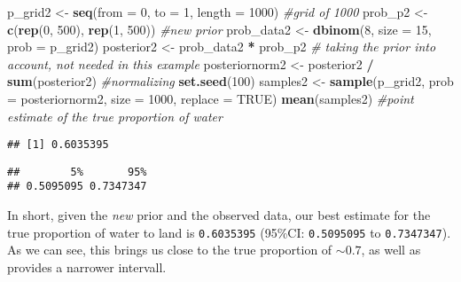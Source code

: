 \documentclass[]{article}
\newenvironment{Shaded}{\begin{snugshade}}{\end{snugshade}}
\newcommand{\CommentTok}[1]{\textcolor[rgb]{0.56,0.35,0.01}{\textit{#1}}}
\newcommand{\DataTypeTok}[1]{\textcolor[rgb]{0.13,0.29,0.53}{#1}}
\newcommand{\DecValTok}[1]{\textcolor[rgb]{0.00,0.00,0.81}{#1}}
\newcommand{\FloatTok}[1]{\textcolor[rgb]{0.00,0.00,0.81}{#1}}
\newcommand{\KeywordTok}[1]{\textcolor[rgb]{0.13,0.29,0.53}{\textbf{#1}}}
\newcommand{\NormalTok}[1]{#1}
\newcommand{\OperatorTok}[1]{\textcolor[rgb]{0.81,0.36,0.00}{\textbf{#1}}}
\newcommand{\OtherTok}[1]{\textcolor[rgb]{0.56,0.35,0.01}{#1}}
\newcommand{\StringTok}[1]{\textcolor[rgb]{0.31,0.60,0.02}{#1}}
\begin{document}
\begin{Shaded}
\begin{Highlighting}[]
\NormalTok{p_grid2 <-}\StringTok{ }\KeywordTok{seq}\NormalTok{(}\DataTypeTok{from =} \DecValTok{0}\NormalTok{, }\DataTypeTok{to =} \DecValTok{1}\NormalTok{, }\DataTypeTok{length =} \DecValTok{1000}\NormalTok{) }\CommentTok{#grid of 1000}
\NormalTok{prob_p2 <-}\StringTok{ }\KeywordTok{c}\NormalTok{(}\KeywordTok{rep}\NormalTok{(}\DecValTok{0}\NormalTok{, }\DecValTok{500}\NormalTok{), }\KeywordTok{rep}\NormalTok{(}\DecValTok{1}\NormalTok{, }\DecValTok{500}\NormalTok{)) }\CommentTok{#new prior}
\NormalTok{prob_data2 <-}\StringTok{ }\KeywordTok{dbinom}\NormalTok{(}\DecValTok{8}\NormalTok{, }\DataTypeTok{size =} \DecValTok{15}\NormalTok{, }\DataTypeTok{prob =}\NormalTok{ p_grid2)}
\NormalTok{posterior2 <-}\StringTok{ }\NormalTok{prob_data2 }\OperatorTok{*}\StringTok{ }\NormalTok{prob_p2 }\CommentTok{# taking the prior into account, not needed in this example}
\NormalTok{posteriornorm2 <-}\StringTok{ }\NormalTok{posterior2 }\OperatorTok{/}\StringTok{ }\KeywordTok{sum}\NormalTok{(posterior2) }\CommentTok{#normalizing}
\KeywordTok{set.seed}\NormalTok{(}\DecValTok{100}\NormalTok{)}
\NormalTok{samples2 <-}\StringTok{ }\KeywordTok{sample}\NormalTok{(p_grid2, }\DataTypeTok{prob =}\NormalTok{ posteriornorm2, }\DataTypeTok{size =} \DecValTok{1000}\NormalTok{, }\DataTypeTok{replace =} \OtherTok{TRUE}\NormalTok{)}
\KeywordTok{mean}\NormalTok{(samples2) }\CommentTok{#point estimate of the true proportion of water}
\end{Highlighting}
\end{Shaded}

\begin{verbatim}
## [1] 0.6035395
\end{verbatim}

\begin{Shaded}
\end{Shaded}

\begin{verbatim}
##        5%       95% 
## 0.5095095 0.7347347
\end{verbatim}

In short, given the \emph{new} prior and the observed data, our best
estimate for the true proportion of water to land is \texttt{0.6035395}
(95\%CI: \texttt{0.5095095} to \texttt{0.7347347}). As we can see, this
brings us close to the true proportion of \(\sim 0.7\), as well as
provides a narrower intervall.
\end{document}
